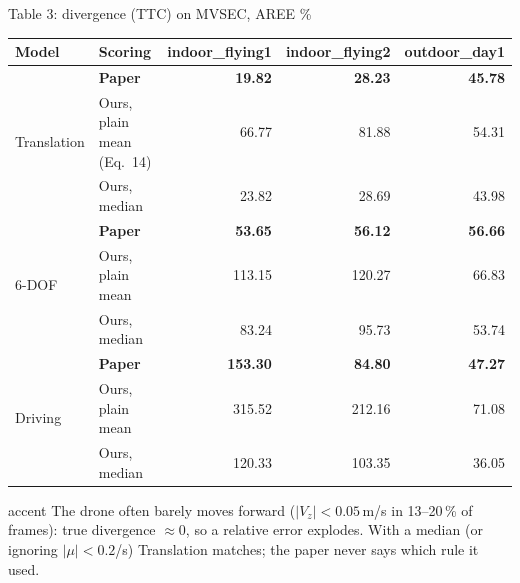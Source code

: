 \documentclass[aspectratio=169,10pt]{beamer}
\newcommand{\G}{\cellcolor{good}}
\newcommand{\M}{\cellcolor{mid}}
\newcommand{\B}{\cellcolor{bad}}
\renewcommand{\arraystretch}{1.12}
\begin{document}
\begin{frame}{Table 3: divergence (TTC) on MVSEC, AREE \%}
  \centering\footnotesize\renewcommand{\arraystretch}{1.0}
  \begin{tabular}{@{}l l r r r@{}}
    \toprule
    Model & Scoring & indoor\_flying1 & indoor\_flying2 & outdoor\_day1 \\
    \midrule
    \multirow{3}{*}{Translation} & \textbf{Paper} & \textbf{19.82} & \textbf{28.23} & \textbf{45.78} \\
    & Ours, plain mean (Eq.~14) & \B 66.77 & \B 81.88 & \M 54.31 \\
    & Ours, median & \G 23.82 & \G 28.69 & \G 43.98 \\
    \midrule
    \multirow{3}{*}{6-DOF} & \textbf{Paper} & \textbf{53.65} & \textbf{56.12} & \textbf{56.66} \\
    & Ours, plain mean & \B 113.15 & \B 120.27 & \M 66.83 \\
    & Ours, median & \B 83.24 & \B 95.73 & \G 53.74 \\
    \midrule
    \multirow{3}{*}{Driving} & \textbf{Paper} & \textbf{153.30} & \textbf{84.80} & \textbf{47.27} \\
    & Ours, plain mean & \B 315.52 & \B 212.16 & \B 71.08 \\
    & Ours, median & \G 120.33 & \M 103.35 & \M 36.05 \\
    \bottomrule
  \end{tabular}

  \vspace{3mm}
  \begin{card}{accent}
    The drone often barely moves forward ($|V_z|<0.05$\,m/s in 13--20\,\% of frames): true divergence
    $\approx 0$, so a relative error explodes. With a median (or ignoring $|\mu|<0.2$/s) Translation
    \alert{matches}; the paper never says which rule it used.
  \end{card}
\end{frame}
\end{document}
